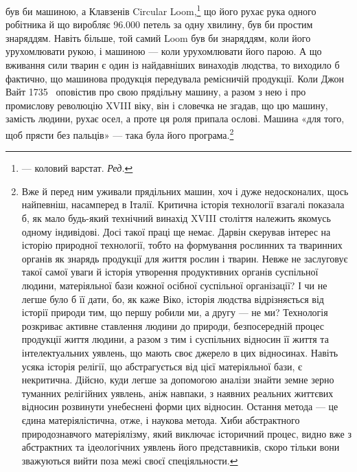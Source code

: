 \parcont{}  %
був би машиною, а Клавзенів Circular Loom,\footnote*{
— коловий варстат. \emph{Ред.}
} що його рухає
рука одного робітника й що виробляє \num{96.000} петель за одну хвилину,
був би простим знаряддям. Навіть більше, той самий Loom
був би знаряддям, коли його урухомлювати рукою, і машиною —
коли урухомлювати його парою. А що вживання сили тварин є
один із найдавніших винаходів людства, то виходило б фактично,
що машинова продукція передувала ремісничій продукції. Коли
Джон Вайт 1735~ оповістив про свою прядільну машину, а
разом з нею і про промислову революцію XVIII віку, він і словечка
не згадав, що цю машину, замість людини, рухає осел, а
проте ця роля припала ослові. Машина «для того, щоб прясти
без пальців» — така була його програма.\footnote{
Вже й перед ним уживали прядільних машин, хоч і дуже недосконалих,
щось найпевніш, насамперед в Італії. Критична історія технології
взагалі показала б, як мало будь-який технічний винахід XVIII століття
належить якомусь одному індивідові. Досі такої праці ще немає. Дарвін
скерував інтерес на історію природної технології, тобто на формування
рослинних та тваринних органів як знарядь продукції для життя рослин і
тварин. Невже не заслуговує такої самої уваги й історія утворення
продуктивних органів суспільної людини, матеріяльної бази кожної
осібної суспільної організації? І чи не легше було б її дати, бо, як каже
Віко, історія людства відрізняється від історії природи тим, що першу
робили ми, а другу — не ми? Технологія розкриває активне ставлення
людини до природи, безпосередній процес продукції життя людини, а
разом з тим і суспільних відносин її життя та інтелектуальних уявлень,
що мають своє джерело в цих відносинах. Навіть усяка історія релігії,
що абстрагується від цієї матеріяльної бази, є некритична. Дійсно,
куди легше за допомогою аналізи знайти земне зерно туманних релігійних
уявлень, аніж навпаки, з наявних реальних життєвих відносин розвинути
унебеснені форми цих відносин. Остання метода — це єдина матеріялістична,
отже, і наукова метода. Хиби абстрактного природознавчого
матеріялізму, який виключає історичний процес, видно вже з абстрактних
та ідеологічних уявлень його представників, скоро тільки вони зважуються
вийти поза межі своєї спеціяльности.
}

